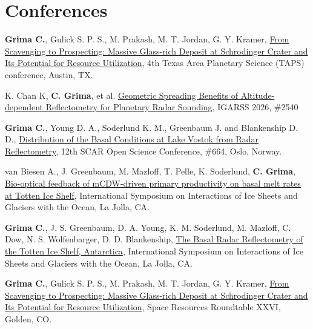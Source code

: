 \section*{Conferences}



\begin{etaremune}
\def\labelenumi{\arabic{enumi}.}

\item
    \textbf{Grima C.}, Gulick S. P. S., M. Prakash, M. T. Jordan, G. Y. Kramer, \href{https://isruinfo.com/public/index.php?page=srr_26#SRR_26_1}{From Scavenging to Prospecting: Massive Glass-rich Deposit at Schrodinger Crater and Its Potential for Resource Utilization}, 4th Texas Area Planetary Science (TAPS) conference, Austin, TX.

\item
    K. Chan K, \textbf{C. Grima}, et al. \href{https://2026.ieeeigarss.org/view_paper.php?PaperNum=2540&SessionID=1536}{Geometric Spreading Benefits of Altitude-dependent Reflectometry for Planetary Radar Sounding}, IGARSS 2026, \#2540

\item 
    \textbf{Grima C.}, Young D. A., Soderlund K. M., Greenbaum J. and Blankenship D. D., \href{https://docs.google.com/spreadsheets/d/e/2PACX-1vQD8oMWDgCA2SLhcYuBswkiARQ_bGOeUrU3Pcww1oO2T5q0ETRDSHVpr8e3FFWrjQnaiVd3ZQv8tCGL/pubhtml?gid=1782002757&single=true}{Distribution of the Basal Conditions at Lake Vostok from Radar Reflectometry}, 12th SCAR Open Science Conference, \#664, Oslo, Norway.

\item
    van Biesen A., J. Greenbaum, M. Mazloff, T. Pelle, K. Soderlund, \textbf{C. Grima}, \href{https://www.igsoc.org/wp-content/uploads/2026/05/IGS2026_abstracts_20260529.pdf}{Bio-optical feedback of mCDW-driven primary productivity on basal melt rates at Totten Ice Shelf}, International Symposium on Interactions of Ice Sheets and Glaciers with the Ocean, La Jolla, CA.

\item
    \textbf{Grima C.}, J. S. Greenbaum, D. A. Young, K. M. Soderlund, M. Mazloff, C. Dow, N. S. Wolfenbarger, D. D. Blankenship, \href{https://www.igsoc.org/wp-content/uploads/2026/05/IGS2026_abstracts_20260529.pdf}{The Basal Radar Reflectometry of the Totten Ice Shelf, Antarctica}, International Symposium on Interactions of Ice Sheets and Glaciers with the Ocean, La Jolla, CA.

\item
     \textbf{Grima C.}, Gulick S. P. S., M. Prakash, M. T. Jordan, G. Y. Kramer, \href{https://isruinfo.com/public/index.php?page=srr_26#SRR_26_1}{From Scavenging to Prospecting: Massive Glass-rich Deposit at Schrodinger Crater and Its Potential for Resource Utilization}, Space Resources Roundtable XXVI, Golden, CO.


\end{etaremune}
